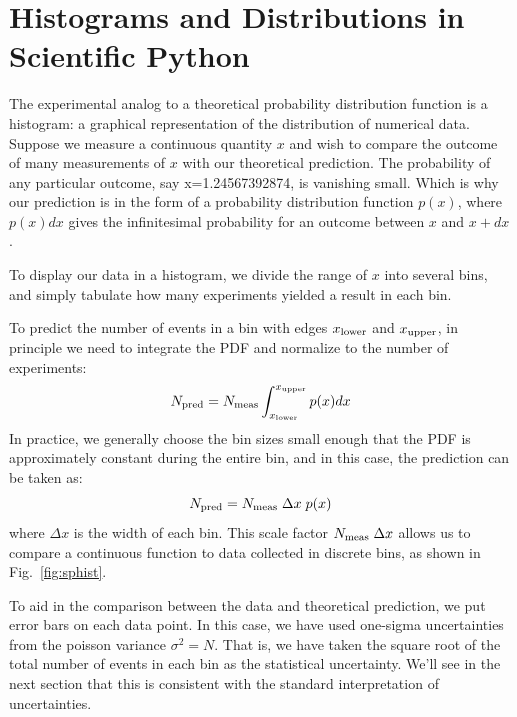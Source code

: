 \documentclass[12pt]{article}
\begin{document}
\section{Histograms and Distributions in Scientific Python}

The experimental analog to a theoretical probability distribution function is a histogram:  a graphical representation of the distribution of numerical data.  Suppose we measure a continuous quantity $x$ and wish to compare the outcome of many measurements of $x$ with our theoretical prediction.  The probability of any  particular outcome, say x=1.24567392874, is vanishing small.  Which is why our prediction is in the form of a probability distribution function $p(x)$, where $p(x) dx$ gives the infinitesimal probability for an outcome between $x$ and $x+dx$.

To display our data in a histogram, we divide the range of $x$ into several bins, and simply tabulate how many experiments yielded a result in each bin.

To predict the number of events in a bin with edges $x_{\rm lower}$ and $x_{\rm upper}$, in principle we need to integrate the PDF and normalize to the number of experiments:
\begin{displaymath}
N_{\rm pred} = N_{\rm meas} \int^{x_{\rm upper}}_{x_{\rm lower}} p(x) dx
\end{displaymath}
In practice, we generally choose the bin sizes small enough that the PDF is approximately constant during the entire bin, and in this case, the prediction can be taken as:
\begin{displaymath}
N_{\rm pred} = N_{\rm meas} \; \Delta x \; p(x)
\end{displaymath}
where $\Delta x$ is the width of each bin.  This scale factor $N_{\rm meas} \; \Delta x$ allows us to compare a continuous function to data collected in discrete bins, as shown in Fig.~\ref{fig:sphist}.

To aid in the comparison between the data and theoretical prediction, we put error bars on each data point.  In this case, we have used one-sigma uncertainties from the poisson variance $\sigma^2 = N$.  That is, we have taken the square root of the total number of events in each bin as the statistical uncertainty.  We'll see in the next section that this is consistent with the standard interpretation of uncertainties.
\end{document}
